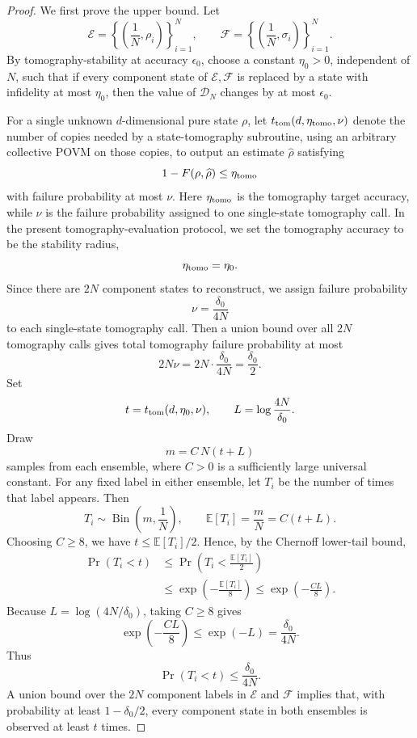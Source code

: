 \documentclass[aps,prx,reprint,superscriptaddress,amsmath,amssymb,longbibliography,floatfix]{revtex4-2}
\newcommand{\scD}{\mathcal{D}}
\newcommand{\scE}{\mathcal{E}}
\newcommand{\scF}{\mathcal{F}}
\theoremstyle{plain}
\theoremstyle{definition}
\theoremstyle{remark}
\begin{document}
\begin{proof}
We first prove the upper bound. Let
\[
    \scE=\left\{\left(\frac1N,\rho_i\right)\right\}_{i=1}^N,
    \qquad
    \scF=\left\{\left(\frac1N,\sigma_i\right)\right\}_{i=1}^N .
\]
By tomography-stability at accuracy \(\epsilon_0\), choose a constant
\(\eta_0>0\), independent of \(N\), such that if every component state of
\(\scE,\scF\) is replaced by a state with infidelity at most \(\eta_0\), then
the value of \(\scD_N\) changes by at most \(\epsilon_0\).

For a single unknown \(d\)-dimensional pure state \(\rho\), let
\(t_{\rm tom}(d,\eta_{\rm tomo},\nu)\) denote the number of copies needed by a
state-tomography subroutine, using an arbitrary collective POVM on those copies,
to output an estimate \(\widehat\rho\) satisfying
\[
    1-F(\rho,\widehat\rho)\le \eta_{\rm tomo}
\]
with failure probability at most \(\nu\). Here \(\eta_{\rm tomo}\) is the
tomography target accuracy, while \(\nu\) is the failure probability assigned to
one single-state tomography call. In the present tomography-evaluation protocol,
we set the tomography accuracy to be the stability radius,
\[
    \eta_{\rm tomo}=\eta_0.
\]
Since there are \(2N\) component states to reconstruct, we assign failure
probability
\[
    \nu=\frac{\delta_0}{4N}
\]
to each single-state tomography call. Then a union bound over all \(2N\)
tomography calls gives total tomography failure probability at most
\[
    2N\nu
    =
    2N\cdot \frac{\delta_0}{4N}
    =
    \frac{\delta_0}{2}.
\]
Set
\[
    t=t_{\rm tom}(d,\eta_0,\nu),
    \qquad
    L=\log\frac{4N}{\delta_0}.
\]
Draw
\begin{equation}
    m=C\,N(t+L)
\label{eq:app-tomography-sample-budget}
\end{equation}
samples from each ensemble, where \(C>0\) is a sufficiently large universal
constant. For any fixed label in either ensemble, let \(T_i\) be the number of
times that label appears. Then
\[
    T_i\sim \operatorname{Bin}\!\left(m,\frac1N\right),
    \qquad
    \mathbb E[T_i]=\frac{m}{N}=C(t+L).
\]
Choosing \(C\ge 8\), we have \(t\le \mathbb E[T_i]/2\). Hence, by the Chernoff
lower-tail bound,
\[
\begin{aligned}
\Pr(T_i<t)
    &\le
    \Pr\!\left(T_i<\frac{\mathbb E[T_i]}2\right)\\
    &\le
    \exp\!\left(-\frac{\mathbb E[T_i]}8\right)
    \le
    \exp\!\left(-\frac{CL}{8}\right).
\end{aligned}
\]
Because \(L=\log(4N/\delta_0)\), taking \(C\ge 8\) gives
\[
    \exp\!\left(-\frac{CL}{8}\right)
    \le
    \exp(-L)
    =
    \frac{\delta_0}{4N}.
\]
Thus
\[
    \Pr(T_i<t)\le \frac{\delta_0}{4N}.
\]
A union bound over the \(2N\) component labels in \(\scE\) and \(\scF\) implies
that, with probability at least \(1-\delta_0/2\), every component state in both
ensembles is observed at least \(t\) times.


\end{proof}
\end{document}
